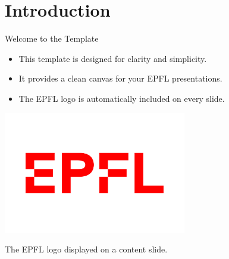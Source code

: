 \section{Introduction}
\begin{frame}{Welcome to the Template}
    \begin{itemize}
        \item This template is designed for clarity and simplicity.
        \item It provides a clean canvas for your EPFL presentations.
        \item The EPFL logo is automatically included on every slide.
    \end{itemize}
    \vspace{0.5cm}
    \centering
    \includegraphics[width=0.6\textwidth]{figures/epfl.png} %
    \par\small The EPFL logo displayed on a content slide.
\end{frame}

